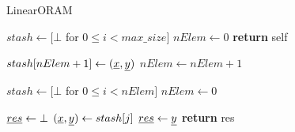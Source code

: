 \begin{algorithm}
\caption{LinearORAM}
\label{alg:obliv_set}
\begin{algorithmic}[1]


\State $stash \gets [ \bot $ for $0 \leq i < max\_size]$
\State $nElem \gets 0$
\State \textbf{return} self
\EndProcedure

\State

\State $stash[nElem + 1] \gets (\underline{ x }, \underline{ y })$
\State $nElem \gets nElem + 1$
\EndProcedure

\State

\State $stash \gets [ \bot $ for $0 \leq i < nElem]$
\State $nElem \gets 0$
\EndProcedure

\State

\State $\underline{ res } \gets \bot$
    \State $(\underline{ x }, \underline{ y }) \gets stash[j]$
        \State $\underline{ res } \gets \underline{ y }$
    \EndOblivIf
\EndFor
\State \textbf{return} res
\EndProcedure

\end{algorithmic}
\end{algorithm}


